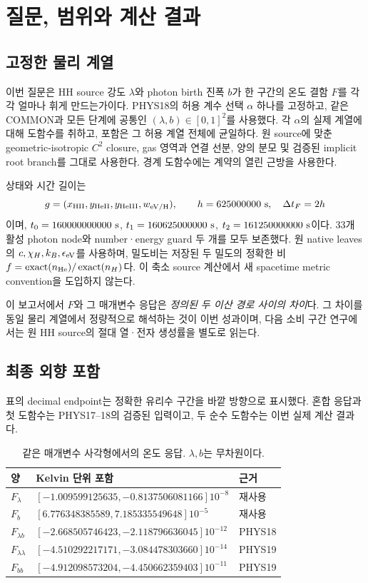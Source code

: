 \section{질문, 범위와 계산 결과}
\subsection{고정한 물리 계열}
이번 질문은 HH source 강도 $\lambda$와 photon birth 진폭 $b$가
한 구간의 온도 결함 $F$를 각각 얼마나 휘게 만드는가이다.
PHYS18의 허용 계수 선택 $\alpha$ 하나를 고정하고,
같은 COMMON과 모든 단계에 공통인 $(\lambda,b)\in[0,1]^2$를 사용했다.
각 $\alpha$의 실제 계열에 대해 도함수를 취하고, 포함은 그 허용 계열 전체에 균일하다.
원 source에 맞춘 geometric-isotropic $C^2$ closure, gas 영역과 연결 선분,
양의 분모 및 검증된 implicit root branch를 그대로 사용한다.
경계 도함수에는 계약의 열린 근방을 사용한다.

상태와 시간 길이는
\[
g=(x_{\rm HII},y_{\rm HeII},y_{\rm HeIII},w_{\rm eV/H}),\qquad
h=625000000\ {\rm s},\quad \Delta t_F=2h
\]
이며, $t_0=160000000000\ {\rm s}$,
$t_1=160625000000\ {\rm s}$,
$t_2=161250000000\ {\rm s}$이다.
33개 활성 photon node와 number·energy guard 두 개를 모두 보존했다.
원 native leaves의 $c,\chi_H,k_B,\epsilon_{\rm eV}$를 사용하며,
밀도비는 저장된 두 밀도의 정확한 비
$f=\operatorname{exact}(n_{\rm He})/\operatorname{exact}(n_H)$다.
이 축소 source 계산에서 새 spacetime metric convention을 도입하지 않는다.

이 보고서에서 $F$와 그 매개변수 응답은 \emph{정의된 두 이산 경로 사이의 차이}다.
그 차이를 동일 물리 계열에서 정량적으로 해석하는 것이 이번 성과이며,
다음 소비 구간 연구에서는 원 HH source의 절대 열·전자 생성률을 별도로 읽는다.

\subsection{최종 외향 포함}
표의 decimal endpoint는 정확한 유리수 구간을 바깥 방향으로 표시했다.
혼합 응답과 첫 도함수는 PHYS17--18의 검증된 입력이고,
두 순수 도함수는 이번 실제 계산 결과다.
\begin{table}[H]\centering\small
\caption{같은 매개변수 사각형에서의 온도 응답. $\lambda,b$는 무차원이다.}
\begin{tabular}{lll}
\toprule
양 & Kelvin 단위 포함 & 근거\\
\midrule
$F_\lambda$ & $[-1.009599125635,-0.8137506081166]10^{-8}$ & 재사용\\
$F_b$ & $[6.776348385589,7.185335549648]10^{-5}$ & 재사용\\
$F_{\lambda b}$ & $[-2.668505746423,-2.118796636045]10^{-12}$ & PHYS18\\
$F_{\lambda\lambda}$ & $[-4.510292217171,-3.084478303660]10^{-14}$ & PHYS19\\
$F_{bb}$ & $[-4.912098573204,-4.450662359403]10^{-11}$ & PHYS19\\
\bottomrule
\end{tabular}
\end{table}

